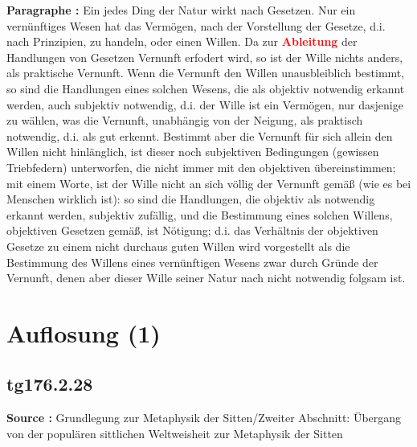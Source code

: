 \documentclass[a4paper,12pt,twoside]{book}
\newcommand{\match}[1]{\textcolor{red}{\textbf{#1}}}
\newcommand{\unnumberedsection}[1]{
	\section*{#1}
	\addcontentsline{toc}{section}{#1}
	\markright{#1}
}
\begin{document}
	\noindent\textbf{Paragraphe : }Ein jedes Ding der Natur wirkt nach Gesetzen. Nur ein vernünftiges Wesen hat das Vermögen, nach der Vorstellung der Gesetze, d.i. nach Prinzipien, zu handeln, oder einen Willen. Da zur \match{Ableitung} der Handlungen von Gesetzen Vernunft erfodert wird, so ist der Wille nichts anders, als praktische Vernunft. Wenn die Vernunft den Willen unausbleiblich bestimmt, so sind die Handlungen eines solchen Wesens, die als objektiv notwendig erkannt werden, auch subjektiv notwendig, d.i. der Wille ist ein Vermögen, nur dasjenige zu wählen, was die Vernunft, unabhängig von der Neigung, als praktisch notwendig, d.i. als gut erkennt. Bestimmt aber die Vernunft für sich allein den Willen nicht hinlänglich, ist dieser noch subjektiven Bedingungen (gewissen Triebfedern) unterworfen, die nicht immer mit den objektiven übereinstimmen; mit einem Worte, ist der Wille nicht an sich völlig der Vernunft gemäß (wie es bei Menschen wirklich ist): so sind die Handlungen, die objektiv als notwendig erkannt werden, subjektiv zufällig, und die Bestimmung eines solchen Willens, objektiven Gesetzen gemäß, ist Nötigung; d.i. das Verhältnis der objektiven Gesetze zu einem nicht durchaus guten Willen wird vorgestellt als die Bestimmung des Willens eines vernünftigen Wesens zwar durch Gründe der Vernunft, denen aber dieser Wille seiner Natur nach nicht notwendig folgsam ist. 
	
	\unnumberedsection{Auflosung (1)} 
	\subsection*{tg176.2.28} 
	\textbf{Source : }Grundlegung zur Metaphysik der Sitten/Zweiter Abschnitt: Übergang von der populären sittlichen Weltweisheit zur Metaphysik der Sitten\\  
	
\end{document}
